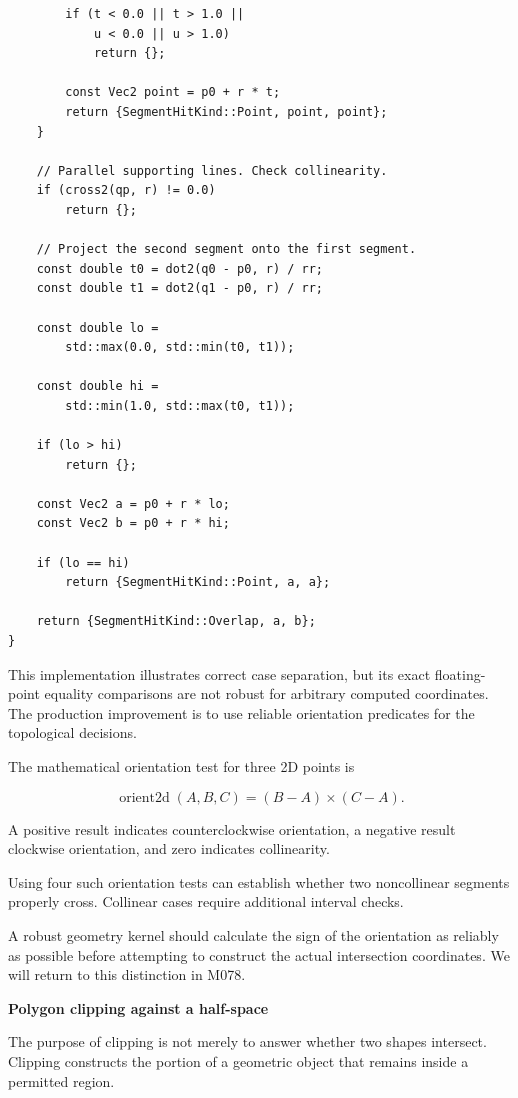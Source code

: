 \begin{verbatim}
        if (t < 0.0 || t > 1.0 ||
            u < 0.0 || u > 1.0)
            return {};

        const Vec2 point = p0 + r * t;
        return {SegmentHitKind::Point, point, point};
    }

    // Parallel supporting lines. Check collinearity.
    if (cross2(qp, r) != 0.0)
        return {};

    // Project the second segment onto the first segment.
    const double t0 = dot2(q0 - p0, r) / rr;
    const double t1 = dot2(q1 - p0, r) / rr;

    const double lo =
        std::max(0.0, std::min(t0, t1));

    const double hi =
        std::min(1.0, std::max(t0, t1));

    if (lo > hi)
        return {};

    const Vec2 a = p0 + r * lo;
    const Vec2 b = p0 + r * hi;

    if (lo == hi)
        return {SegmentHitKind::Point, a, a};

    return {SegmentHitKind::Overlap, a, b};
}
\end{verbatim}

This implementation illustrates correct case separation, but its exact floating-point equality comparisons are not robust for arbitrary computed coordinates. The production improvement is to use reliable orientation predicates for the topological decisions.

The mathematical orientation test for three 2D points is

\[
\operatorname{orient2d}(A,B,C) = (B-A)\times(C-A).
\]

A positive result indicates counterclockwise orientation, a negative result clockwise orientation, and zero indicates collinearity.

Using four such orientation tests can establish whether two noncollinear segments properly cross. Collinear cases require additional interval checks.

A robust geometry kernel should calculate the sign of the orientation as reliably as possible before attempting to construct the actual intersection coordinates. We will return to this distinction in M078.

\textbf{Polygon clipping against a half-space}

The purpose of clipping is not merely to answer whether two shapes intersect. Clipping constructs the portion of a geometric object that remains inside a permitted region.

